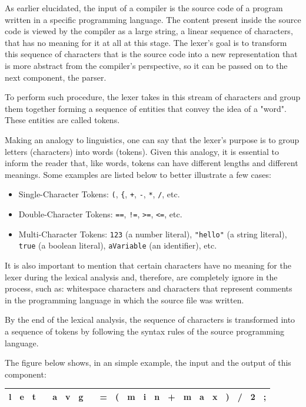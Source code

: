 As earlier elucidated, the input of a compiler is the source code of a program written in a specific programming language. The content present inside the source code is viewed by the compiler as a large string, a linear sequence of characters, that has no meaning for it at all at this stage. The lexer's goal is to transform this sequence of characters that is the source code into a new representation that is more abstract from the compiler's perspective, so it can be passed on to the next component, the parser.

To perform such procedure, the lexer takes in this stream of characters and group them together forming a sequence of entities that convey the idea of a "word". These entities are called tokens.

Making an analogy to linguistics, one can say that the lexer's purpose is to group letters (characters) into words (tokens). Given this analogy, it is essential to inform the reader that, like words, tokens can have different lengths and different meanings. Some examples are listed below to better illustrate a few cases:
\begin{itemize}
    \item Single-Character Tokens: \texttt{(}, \texttt{\{}, \texttt{+}, \texttt{-}, \texttt{*}, \texttt{/}, etc.
    \item Double-Character Tokens: \texttt{==}, \texttt{!=}, \texttt{>=}, \texttt{<=}, etc.
    \item Multi-Character Tokens: \texttt{123} (a number literal), \texttt{"hello"} (a string literal), \texttt{true} (a boolean literal), \texttt{aVariable} (an identifier), etc.
\end{itemize}

It is also important to mention that certain characters have no meaning for the lexer during the lexical analysis and, therefore, are completely ignore in the process, such as: whitespace characters and characters that represent comments in the programming language in which the source file was written.

By the end of the lexical analysis, the sequence of characters is transformed into a sequence of tokens by following the syntax rules of the source programming language.

The figure below shows, in an simple example, the input and the output of this component:

\begin{table}[H]
    \centering
    \begin{tabular}{|c|c|c|c|c|c|c|c|c|c|c|c|c|c|c|c|c|c|c|c|c|}
        \hline
        l & e & t &  & a & v & g &  & = & ( & m & i & n & + & m & a & x & ) & / & 2 & ; \\
        \hline
    \end{tabular}
\end{table}

